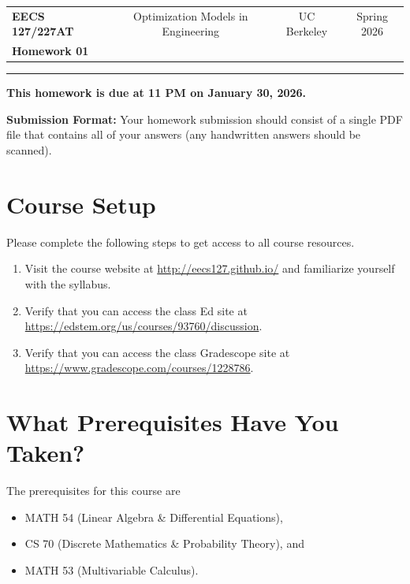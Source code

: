 \documentclass[10pt]{article}
\theoremstyle{definition}
\theoremstyle{plain}
\begin{document}
\begin{center}
\begin{tabular}{lccc}
\textbf{EECS 127/227AT} & Optimization Models in Engineering & UC Berkeley & Spring 2026 \\
\textbf{Homework 01} & & &
\end{tabular}
\end{center}
\noindent\rule{\textwidth}{2pt}

\vspace{1em}

\begin{center}
{\Large \textbf{This homework is due at 11 PM on January 30, 2026.}}
\end{center}

\noindent\textbf{Submission Format:} Your homework submission should consist of a single PDF file that contains all of your answers (any handwritten answers should be scanned).

\section{Course Setup}

Please complete the following steps to get access to all course resources.

\begin{enumerate}[label=(\alph*)]
    \item Visit the course website at \url{http://eecs127.github.io/} and familiarize yourself with the syllabus.
    \item Verify that you can access the class Ed site at \url{https://edstem.org/us/courses/93760/discussion}.
    \item Verify that you can access the class Gradescope site at \url{https://www.gradescope.com/courses/1228786}.
\end{enumerate}

\newpage

\section{What Prerequisites Have You Taken?}

The prerequisites for this course are
\begin{itemize}
    \item MATH 54 (Linear Algebra \& Differential Equations),
    \item CS 70 (Discrete Mathematics \& Probability Theory), and
    \item MATH 53 (Multivariable Calculus).
\end{itemize}
\end{document}

